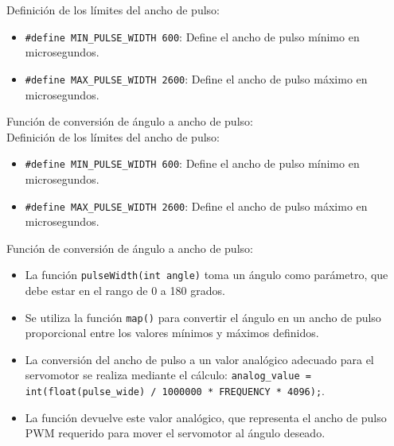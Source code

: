                 Definición de los límites del ancho de pulso:\\ 
    
                \begin{itemize}
                    \item \texttt{\#define MIN\_PULSE\_WIDTH 600}: Define el ancho de pulso mínimo en microsegundos.
                    \item \texttt{\#define MAX\_PULSE\_WIDTH 2600}: Define el ancho de pulso máximo en microsegundos.
                \end{itemize}
    
                Función de conversión de ángulo a ancho de pulso:\\ 
    
                Definición de los límites del ancho de pulso:\\
    
                \begin{itemize}
                \item \texttt{\#define MIN\_PULSE\_WIDTH 600}: Define el ancho de pulso mínimo en microsegundos.
                \item \texttt{\#define MAX\_PULSE\_WIDTH 2600}: Define el ancho de pulso máximo en microsegundos.
                \end{itemize}
    
                Función de conversión de ángulo a ancho de pulso:\\
    
                \begin{itemize}
                \item La función \texttt{pulseWidth(int angle)} toma un ángulo como parámetro, que debe estar en el rango de 0 a 180 grados.
                \item Se utiliza la función \texttt{map()} para convertir el ángulo en un ancho de pulso proporcional entre los valores mínimos y máximos definidos.
                \item La conversión del ancho de pulso a un valor analógico adecuado para el servomotor se realiza mediante el cálculo: \texttt{analog\_value = int(float(pulse\_wide) / 1000000 * FREQUENCY * 4096);}.
                \item La función devuelve este valor analógico, que representa el ancho de pulso PWM requerido para mover el servomotor al ángulo deseado.
                \end{itemize}
                
